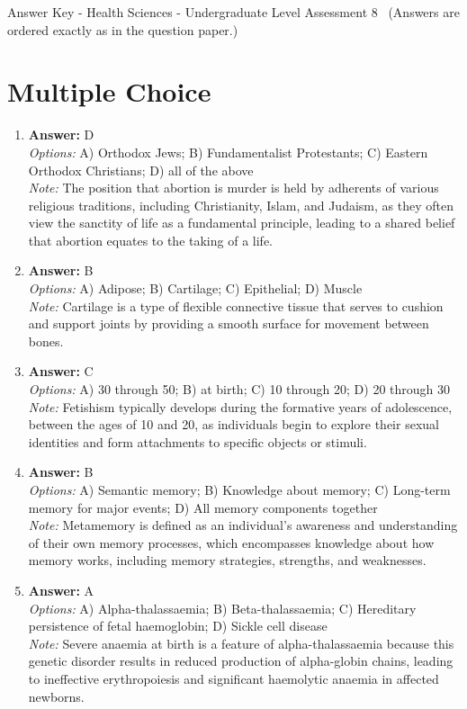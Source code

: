 \documentclass[12pt]{article}
\begin{document}
\begin{center}
Answer Key - Health Sciences - Undergraduate Level Assessment 8 \
\small (Answers are ordered exactly as in the question paper.)
\end{center}

\section*{Multiple Choice}
\begin{enumerate}[label=\arabic*.]
\item \textbf{Answer:} D
\\ \textit{Options:} A) Orthodox Jews; B) Fundamentalist Protestants; C) Eastern Orthodox Christians; D) all of the above
\\ \textit{Note:} The position that abortion is murder is held by adherents of various religious traditions, including Christianity, Islam, and Judaism, as they often view the sanctity of life as a fundamental principle, leading to a shared belief that abortion equates to the taking of a life.
\item \textbf{Answer:} B
\\ \textit{Options:} A) Adipose; B) Cartilage; C) Epithelial; D) Muscle
\\ \textit{Note:} Cartilage is a type of flexible connective tissue that serves to cushion and support joints by providing a smooth surface for movement between bones.
\item \textbf{Answer:} C
\\ \textit{Options:} A) 30 through 50; B) at birth; C) 10 through 20; D) 20 through 30
\\ \textit{Note:} Fetishism typically develops during the formative years of adolescence, between the ages of 10 and 20, as individuals begin to explore their sexual identities and form attachments to specific objects or stimuli.
\item \textbf{Answer:} B
\\ \textit{Options:} A) Semantic memory; B) Knowledge about memory; C) Long-term memory for major events; D) All memory components together
\\ \textit{Note:} Metamemory is defined as an individual's awareness and understanding of their own memory processes, which encompasses knowledge about how memory works, including memory strategies, strengths, and weaknesses.
\item \textbf{Answer:} A
\\ \textit{Options:} A) Alpha-thalassaemia; B) Beta-thalassaemia; C) Hereditary persistence of fetal haemoglobin; D) Sickle cell disease
\\ \textit{Note:} Severe anaemia at birth is a feature of alpha-thalassaemia because this genetic disorder results in reduced production of alpha-globin chains, leading to ineffective erythropoiesis and significant haemolytic anaemia in affected newborns.
\end{enumerate}
\end{document}
